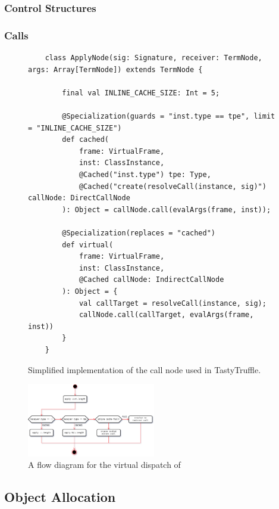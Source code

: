 \subsubsection*{Control Structures}

\subsubsection*{Calls}

\begin{figure}[H]
	\begin{verbatim}
	class ApplyNode(sig: Signature, receiver: TermNode, args: Array[TermNode]) extends TermNode {
		
		final val INLINE_CACHE_SIZE: Int = 5;
		
		@Specialization(guards = "inst.type == tpe", limit = "INLINE_CACHE_SIZE")
		def cached(
			frame: VirtualFrame,
			inst: ClassInstance,
			@Cached("inst.type") tpe: Type,
			@Cached("create(resolveCall(instance, sig)") callNode: DirectCallNode
		): Object = callNode.call(evalArgs(frame, inst));
		
		@Specialization(replaces = "cached")
		def virtual(
			frame: VirtualFrame,
			inst: ClassInstance,
			@Cached callNode: IndirectCallNode
		): Object = {
			val callTarget = resolveCall(instance, sig);
			callNode.call(callTarget, evalArgs(frame, inst))
		}
	}
	\end{verbatim}
	\caption{Simplified implementation of the call node used in TastyTruffle.}
	
\end{figure}

	
\begin{figure}[H]
	\centering
	\includegraphics[width=0.5\textwidth]{figures/tastytruffle-indirect-example.png}
	\caption{A flow diagram for the virtual dispatch of }
\end{figure}

\subsection*{Object Allocation}

